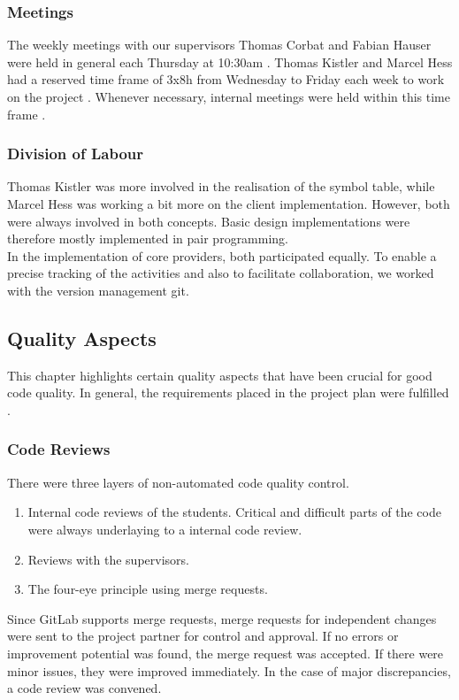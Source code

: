 \subsubsection{Meetings}
The weekly meetings with our supervisors Thomas Corbat and Fabian Hauser were held in general each Thursday at 10:30am \cite{projectplan}.
Thomas Kistler and Marcel Hess had a reserved time frame of 3x8h from Wednesday to
Friday each week to work on the project \cite{projectplan}.
Whenever necessary, internal meetings were held within this time frame \cite{projectplan}.

\subsubsection{Division of Labour}
Thomas Kistler was more involved in the realisation of the symbol table,
while Marcel Hess was working a bit more on the client implementation.
However, both were always involved in both concepts.
Basic design implementations were therefore mostly implemented in pair programming.\\

In the implementation of core providers, both participated equally.
To enable a precise tracking of the activities and also to facilitate collaboration,
we worked with the version management git.

\subsection{Quality Aspects}
This chapter highlights certain quality aspects that have been crucial for good code quality.
In general, the requirements placed in the project plan were fulfilled \cite{projectplan}.

\subsubsection{Code Reviews}
There were three layers of non-automated code quality control.
\begin{enumerate}
    \item Internal code reviews of the students. Critical and difficult parts of the code were always underlaying to a internal code review.
    \item Reviews with the supervisors.
    \item The four-eye principle using merge requests.
\end{enumerate}


Since GitLab supports merge requests,
merge requests for independent changes were sent to the project partner for control and approval.
If no errors or improvement potential was found, the merge request was accepted.
If there were minor issues, they were improved immediately.
In the case of major discrepancies, a code review was convened.


